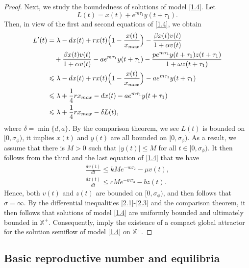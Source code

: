 \documentclass[10pt,a4paper]{amsart}
\numberwithin{equation}{section}
\begin{document}
\begin{proof}
Next, we study the boundedness of solutions of model \eqref{1.4}. Let
 $$
 L(t)=x(t)+e^{m\tau_1}y(t+\tau_1).
 $$
Then,  in view of the first and second equations of \eqref{1.4}, we obtain
\begin{equation} \label{2.1}
 \begin{aligned}
 L'(t)&=\lambda-dx(t)+rx(t)\Big(1-\frac{x(t)}{x_{\rm max}}\Big)
  -\frac{\beta x(t)v(t)}{1+\alpha v(t)}   \\
 &\quad +\frac{\beta x(t)v(t)}{1+\alpha v(t)}-ae^{m\tau_1}y(t+\tau_1)-\frac{pe^{m\tau_1}y(t+\tau_1)z(t+\tau_1)}{1+\omega z(t+\tau_1)}  \\
 &\leqslant\lambda-dx(t)+rx(t)\Big(1-\frac{x(t)}{x_{\rm max}}\Big)-ae^{m\tau_1}y(t+\tau_1)   \\
 &\leqslant\lambda+\frac{1}{4}rx_{\rm max}-dx(t)-ae^{m\tau_1}y(t+\tau_1)   \\
 &\leqslant \lambda+\frac{1}{4}rx_{\rm max}-\delta L(t),
 \end{aligned}
\end{equation}
where $\delta=\min\{d,a\}$. By the comparison theorem,  we see $L(t)$ is bounded
on $[0, \sigma_{\phi})$, it implies $x(t)$ and $y(t)$ are all bounded on
$[0, \sigma_{\phi})$.  As a result, we assume that there is $M>0$ such that
$|y(t)|\leq M$ for all $t\in [0, \sigma_{\phi})$. It then follows from  the third and
the last equation of  \eqref{1.4} that we have
 \begin{gather}
 \frac{dv(t)}{dt}\leqslant k Me^{-m\tau_2}-\mu v(t),  \label{2.2} \\
 \frac{dz(t)}{dt}\leqslant cMe^{-m\tau_3}-bz(t).\label{2.3}
 \end{gather}
Hence, both $v(t)$ and $z(t)$ are bounded on $[0, \sigma_{\phi})$, and then
\cite[Theorem 2.3.1]{HV} follows that $\sigma=\infty$.
By the differential inequalities \eqref{2.1}-\eqref{2.3} and the comparison theorem,
it then follows that solutions of model \eqref{1.4} are uniformly bounded and
ultimately bounded in $\mathbb{X}^+$. Consequently,
\cite [Corollary 3.6.2 and Theorem 4.5.2]{HV}
imply the existence of a compact global attractor for the solution semiflow of model
\eqref{1.4} on $\mathbb{X}^+$.
\end{proof}


\subsection{Basic reproductive number and equilibria}
\end{document}

